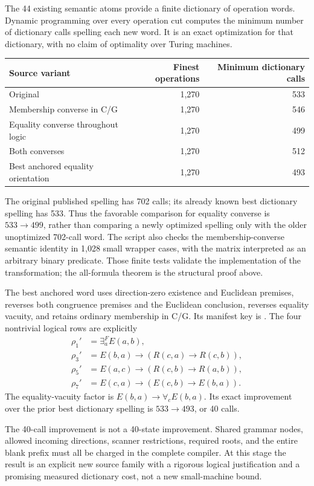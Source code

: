The 44 existing semantic atoms provide a finite dictionary of
operation words.  Dynamic programming over every operation cut
computes the minimum number of dictionary calls spelling each
new word.  It is an exact optimization for that dictionary, with
no claim of optimality over Turing machines.

\begin{center}
\begin{tabular}{lrr}
\hline
Source variant & Finest operations & Minimum dictionary calls\\
\hline
Original & 1,270 & 533\\
Membership converse in C/G & 1,270 & 546\\
Equality converse throughout logic & 1,270 & 499\\
Both converses & 1,270 & 512\\
Best anchored equality orientation & 1,270 & 493\\
\hline
\end{tabular}
\end{center}

The original published spelling has 702 calls; its already known
best dictionary spelling has 533.  Thus the favorable comparison
for equality converse is $533\to499$, rather than comparing a newly
optimized spelling only with the older unoptimized 702-call word.
The script also checks the membership-converse semantic identity
in 1,028 small wrapper cases, with the matrix interpreted as an
arbitrary binary predicate.  Those finite tests validate the
implementation of the transformation; the all-formula theorem is
the structural proof above.

The best anchored word uses direction-zero existence and
Euclidean premises, reverses both congruence premises and the
Euclidean conclusion, reverses equality vacuity, and retains
ordinary membership in C/G.  Its manifest key is
.  The four
nontrivial logical rows are explicitly
\[
\begin{aligned}
\rho_1'&=\exists^F_aE(a,b),\\
\rho_3'&=E(b,a)\to(R(c,a)\to R(c,b)),\\
\rho_5'&=E(a,c)\to(R(c,b)\to R(a,b)),\\
\rho_7'&=E(c,a)\to(E(c,b)\to E(b,a)).
\end{aligned}
\]
The equality-vacuity factor is $E(b,a)\to\forall_cE(b,a)$.
Its exact improvement over the prior best dictionary spelling
is $533\to493$, or 40 calls.

The 40-call improvement is not a 40-state improvement.  Shared
grammar nodes, allowed incoming directions, scanner restrictions,
required roots, and the entire blank prefix must all be charged in
the complete compiler.  At this stage the result is an explicit
new source family with a rigorous logical justification and a
promising measured dictionary cost, not a new small-machine bound.

